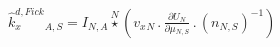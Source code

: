 \documentclass[border=2pt]{standalone}
\begin{document}
${{\hat{k}^{d,Fick}_x}}{_{A, S}}={{I}}{_{N, A}} \stackrel{N}{\star} \left({{v_x}}{_{N}} \, . \, \frac{\partial{{U}{_{N}}}}{\partial{{{\mu}}{_{N, S}}}} \, . \, \left( {n}{_{N, S}} \right)^{-1}\right)$
\end{document}
